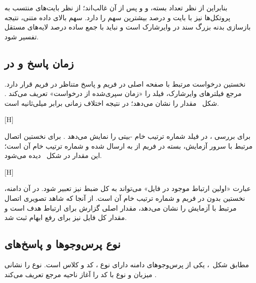 بنابراین از نظر تعداد بسته،  و  و پس از آن  غالب‌اند؛ از نظر
بایت‌های منتسب به پروتکل‌ها نیز  با  بایت و  درصد بیشترین سهم را دارد.
سهم بالای داده متنی، نتیجه بازسازی بدنه بزرگ سند  در وایرشارک است و نباید با جمع
ساده درصد لایه‌های مستقل تفسیر شود.

\subsection{زمان پاسخ  و  در }

نخستین درخواست مرتبط با صفحه اصلی در فریم  و پاسخ  متناظر
در فریم  قرار دارد. مرجع فیلترهای وایرشارک، فیلد  را «زمان سپری‌شده از
درخواست» تعریف می‌کند . شکل~ مقدار
 را نشان می‌دهد؛ در نتیجه اختلاف زمانی برابر
 میلی‌ثانیه است.

[H]

برای بررسی ، در  فیلد
 شماره ترتیب خام -بیتی را نمایش می‌دهد .
برای نخستین اتصال  مرتبط با سرور  آزمایش، بسته  در فریم 
از  به  ارسال شده و شماره ترتیب خام آن  است؛ این مقدار در
شکل~ دیده می‌شود.

[H]

عبارت «اولین ارتباط  موجود در فایل» می‌تواند به کل ضبط نیز تعبیر شود. در آن دامنه،
نخستین  بدون  در فریم  و شماره ترتیب خام آن  است. از آنجا که
شاهد تصویری  اتصال مرتبط با آزمایش  را نشان می‌دهد، مقدار اصلی گزارش برای ارتباط
هدف  است و مقدار کل فایل نیز برای رفع ابهام ثبت شد.

\subsection{نوع پرس‌وجوها و پاسخ‌های }

مطابق شکل~، یکی از پرس‌وجوهای دامنه
 دارای نوع ، کد  و کلاس  است.  نوع
 را نشانی میزبان و نوع  با کد  را آغاز ناحیه مرجع تعریف می‌کند .


